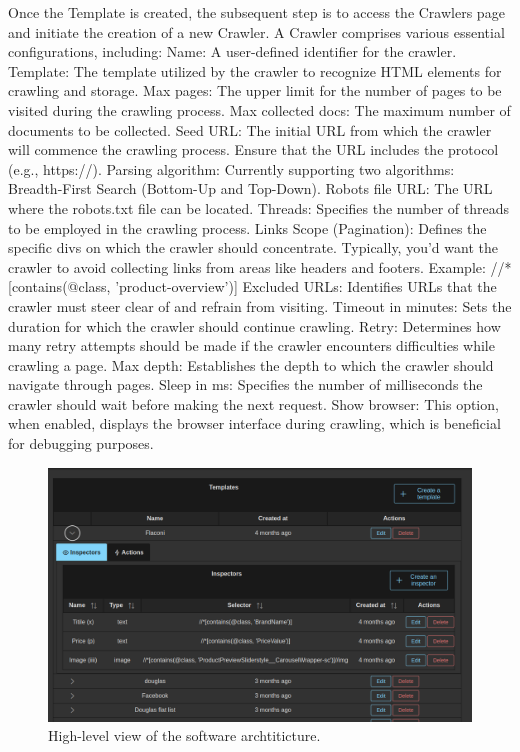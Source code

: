 Once the Template is created, the subsequent step is to access the Crawlers page and initiate the creation of a new Crawler. A Crawler comprises various essential configurations, including:
Name: A user-defined identifier for the crawler.
Template: The template utilized by the crawler to recognize HTML elements for crawling and storage.
Max pages: The upper limit for the number of pages to be visited during the crawling process.
Max collected docs: The maximum number of documents to be collected.
Seed URL: The initial URL from which the crawler will commence the crawling process. Ensure that the URL includes the protocol (e.g., https://).
Parsing algorithm: Currently supporting two algorithms: Breadth-First Search (Bottom-Up and Top-Down).
Robots file URL: The URL where the robots.txt file can be located.
Threads: Specifies the number of threads to be employed in the crawling process.
Links Scope (Pagination): Defines the specific divs on which the crawler should concentrate. Typically, you'd want the crawler to avoid collecting links from areas like headers and footers. Example: //*[contains(@class, 'product-overview')]
Excluded URLs: Identifies URLs that the crawler must steer clear of and refrain from visiting.
Timeout in minutes: Sets the duration for which the crawler should continue crawling.
Retry: Determines how many retry attempts should be made if the crawler encounters difficulties while crawling a page.
Max depth: Establishes the depth to which the crawler should navigate through pages.
Sleep in ms: Specifies the number of milliseconds the crawler should wait before making the next request.
Show browser: This option, when enabled, displays the browser interface during crawling, which is beneficial for debugging purposes.

\begin{figure}[h]	
     \centering
     \includegraphics[width=13cm]{images/demo-3.png}
     \caption{High-level view of the software archtiticture.}
     \label{fig:software-arch}
\end{figure}

